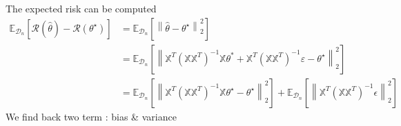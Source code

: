 The expected risk can be computed 
\begin{align*}
    \mathbb{E}_{\mathcal{D}_n}[\mathcal{R}(\hat{\theta }) - \mathcal{R}(\theta ^\star )] 
        &= \mathbb{E}_{\mathcal{D}_n} [ \left\| \hat{\theta } - \theta ^\star  \right\| _2 ^2 ] \\
        &= \mathbb{E}_{\mathcal{D}_n} [ \left\| \mathbb{X}^T (\mathbb{X}\mathbb{X}^T)^{-1} \mathbb{X} \theta^\ast + \mathbb{X}^T (\mathbb{X}\mathbb{X}^T)^{-1} \varepsilon - \theta ^\star  \right\| _2 ^2 ] \\
        &= \mathbb{E}_{\mathcal{D}_n} [ \left\| \mathbb{X}^T (\mathbb{X} \mathbb{X}^T)^{-1} \mathbb{X} \theta ^\star - \theta ^\star  \right\| _2 ^2 ] + \mathbb{E}_{\mathcal{D}_n} [ \left\| \mathbb{X}^T (\mathbb{X} \mathbb{X}^T)^{-1} \epsilon  \right\| _2 ^2 ]
\end{align*}
We find back two term : bias \& variance
